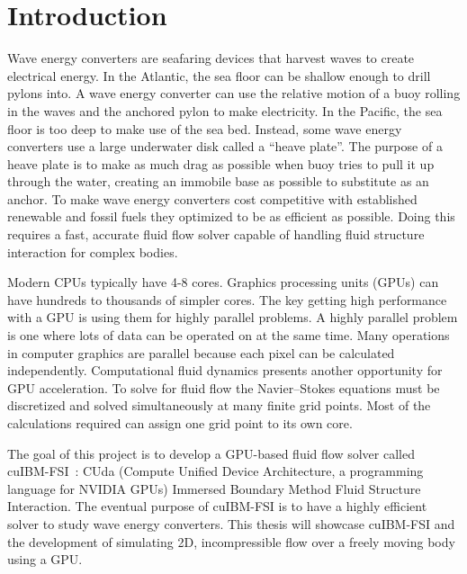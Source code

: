 \maketitle

\mainmatter

\chapter{Introduction}
Wave energy converters are seafaring devices that harvest waves to create electrical energy. 
In the Atlantic, the sea floor can be shallow enough to drill pylons into. 
A wave energy converter can use the relative motion of a buoy rolling in the waves and the anchored pylon to make electricity. 
In the Pacific, the sea floor is too deep to make use of the sea bed. 
Instead, some wave energy converters use a large underwater disk called a ``heave plate''.
The purpose of a heave plate is to make as much drag as possible when buoy tries to pull it up through the water, creating an immobile base as possible to substitute as an anchor. 
To make wave energy converters cost competitive with established renewable and fossil fuels they optimized to be as efficient as possible. 
Doing this requires a fast, accurate fluid flow solver capable of handling fluid structure interaction for complex bodies. 

Modern CPUs typically have 4-8 cores. 
Graphics processing units (GPUs) can have hundreds to thousands of simpler cores. 
The key getting high performance with a GPU is using them for highly parallel problems.
A highly parallel problem is one where lots of data can be operated on at the same time. 
Many operations in computer graphics are parallel because each pixel can be calculated independently. 
Computational fluid dynamics presents another opportunity for GPU acceleration. 
To solve for fluid flow the Navier--Stokes equations must be discretized and solved simultaneously at many finite grid points. 
Most of the calculations required can assign one grid point to its own core. 

The goal of this project is to develop a GPU-based fluid flow solver called cuIBM-FSI~\cite{cuIBM-v0.1}: CUda (Compute Unified Device Architecture, a programming language for NVIDIA GPUs) Immersed Boundary Method Fluid Structure Interaction. 
The eventual purpose of cuIBM-FSI is to have a highly efficient solver to study wave energy converters.
This thesis will showcase cuIBM-FSI and the development of simulating 2D, incompressible flow over a freely moving body using a GPU. 

